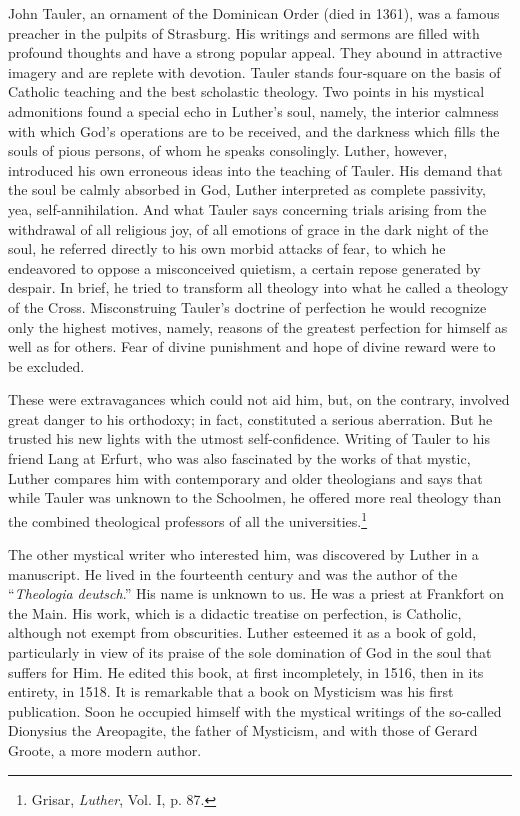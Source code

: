 John Tauler, an ornament of the Dominican Order (died in
1361), was a famous preacher in the pulpits of Strasburg. His
writings and sermons are filled with profound thoughts and have
a strong popular appeal. They abound in attractive imagery and
are replete with devotion. Tauler stands four-square on the basis of
Catholic teaching and the best scholastic theology. Two points in
his mystical admonitions found a special echo in Luther’s soul, namely,
the interior calmness with which God’s operations are to be received,
and the darkness which fills the souls of pious persons, of whom
he speaks consolingly. Luther, however, introduced his own erroneous
ideas into the teaching of Tauler. His demand that the soul be calmly
absorbed in God, Luther interpreted as complete passivity, yea,
self-annihilation. And what Tauler says concerning trials arising from
the withdrawal of all religious joy, of all emotions of grace in the
dark night of the soul, he referred directly to his own morbid
attacks of fear, to which he endeavored to oppose a misconceived
quietism, a certain repose generated by despair. In brief, he tried to
transform all theology into what he called a theology of the Cross.
Misconstruing Tauler’s doctrine of perfection he would recognize
only the highest motives, namely, reasons of the greatest perfection
for himself as well as for others. Fear of divine punishment and hope
of divine reward were to be excluded.

These were extravagances which could not aid him, but, on the
contrary, involved great danger to his orthodoxy; in fact, constituted
a serious aberration. But he trusted his new lights with the utmost
self-confidence. Writing of Tauler to his friend Lang at Erfurt, who
was also fascinated by the works of that mystic, Luther compares
him with contemporary and older theologians and says that while
Tauler was unknown to the Schoolmen, he offered more real theology
than the combined theological professors of all the universities.\footnote
{Grisar, \textit{Luther}, Vol. I, p. 87.}

The other mystical writer who interested him, was discovered by
Luther in a manuscript. He lived in the fourteenth century and was
the author of the “\textit{Theologia deutsch}.” His name is unknown to us.
He was a priest at Frankfort on the Main. His work, which is a
didactic treatise on perfection, is Catholic, although not exempt from
obscurities. Luther esteemed it as a book of gold, particularly in
view of its praise of the sole domination of God in the soul that
suffers for Him. He edited this book, at first incompletely, in 1516,
then in its entirety, in 1518. It is remarkable that a book on Mysticism
was his first publication. Soon he occupied himself with the
mystical writings of the so-called Dionysius the Areopagite, the father
of Mysticism, and with those of Gerard Groote, a more modern
author.

